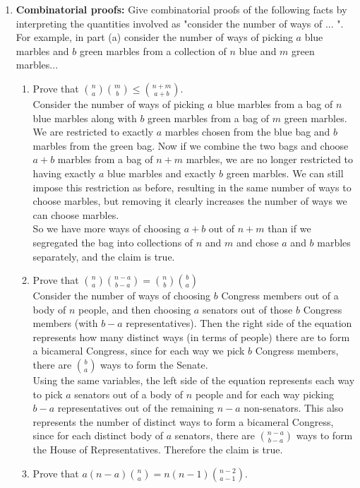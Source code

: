 \documentclass[11pt,fleqn]{article}
\begin{document}
\begin{enumerate}
\newpage
\item \textbf{Combinatorial proofs:} 
Give combinatorial proofs of the following facts by interpreting the quantities involved as 
"consider the number of ways of ... ". For example, in part (a) consider the number of 
ways of picking $a$ blue marbles and $b$ green marbles from a collection of $n$ 
blue and $m$ green marbles... 
\begin{enumerate} 
\item Prove that $\binom{n}{a} \binom{m}{b} \leq \binom{n+m}{a+b}$. \\
Consider the number of ways of picking $a$ blue marbles from a bag of $n$ blue marbles along with $b$ green marbles from a bag of $m$ green marbles. We are restricted to exactly $a$ marbles chosen from the blue bag and $b$ marbles from the green bag. Now if we combine the two bags and choose $a+b$ marbles from a bag of $n+m$ marbles, we are no longer restricted to having exactly $a$ blue marbles and exactly $b$ green marbles. We can still impose this restriction as before, resulting in the same number of ways to choose marbles, but removing it clearly increases the number of ways we can choose marbles. \\
So we have more ways of choosing $a+b$ out of $n+m$ than if we segregated the bag into collections of $n$ and $m$ and chose $a$ and $b$ marbles separately, and the claim is true.
\item Prove that $\binom{n}{a} \binom{n-a}{b-a} = \binom{n}{b} \binom{b}{a}$ \\
Consider the number of ways of choosing $b$ Congress members out of a body of $n$ people, and then choosing $a$ senators out of those $b$ Congress members (with $b-a$ representatives). Then the right side of the equation represents how many distinct ways (in terms of people) there are to form a bicameral Congress, since for each way we pick $b$ Congress members, there are $\binom{b}{a}$ ways to form the Senate. \\
Using the same variables, the left side of the equation represents each way to pick $a$ senators out of a body of $n$ people and for each way picking $b-a$ representatives out of the remaining $n-a$ non-senators. This also represents the number of distinct ways to form a bicameral Congress, since for each distinct body of $a$ senators, there are $\binom{n-a}{b-a}$ ways to form the House of Representatives. Therefore the claim is true.
\item Prove that $a(n-a) \binom{n}{a} = n(n-1) \binom{n-2}{a-1}$. \\

\end{enumerate}
\end{enumerate}
\end{document}
